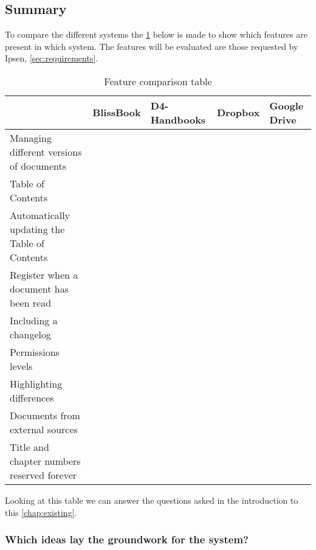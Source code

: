 \subsection{Summary}
To compare the different systems the \cref{tab:Exsisting} below is made to show which features are present in which system.
The features will be evaluated are those requested by Ipsen, \cref{sec:requirements}.

\begin{table}[H]
	\begin{center}
		\begin{tabular}{| m{5cm}|m{1.6cm}|m{2cm}|m{1.5cm}|m{1.2cm}|}
			\hline
			& BlissBook  & D4-Handbooks & Dropbox & Google \newline Drive \\
			\hline
			Managing different versions of documents & \checkmark &  &  & \checkmark \\
			\hline
			Table of Contents & \checkmark & \checkmark  & & \\
			\hline
			Automatically updating the Table of Contents & \checkmark & \checkmark  &  & \\
			\hline
			Register when a document has been read & \checkmark & \checkmark &  & \\
			\hline
			Including a changelog & \checkmark & \checkmark  &  & \\
			\hline
			Permissions levels & \checkmark &  & \checkmark & \checkmark \\
			\hline
			Highlighting differences & \checkmark &  &  & \checkmark\\
			\hline
			Documents from external \newline sources &  &  & \checkmark & \checkmark \\
			\hline
			Title and chapter numbers \newline reserved forever &  &  &  & \\
			\hline
		\end{tabular}
		\caption{Feature comparison table}\label{tab:Exsisting}
	\end{center}
\end{table}

Looking at this table we can answer the questions asked in the introduction to this \cref{chap:existing}.

\subsubsection*{Which ideas lay the groundwork for the system?}

